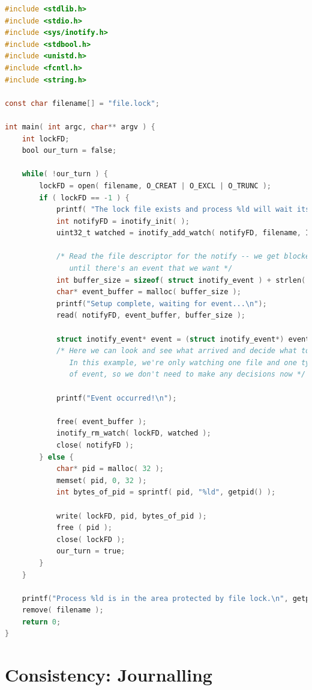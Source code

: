 \begin{lstlisting}[language=C]
#include <stdlib.h>
#include <stdio.h>
#include <sys/inotify.h>
#include <stdbool.h>
#include <unistd.h>
#include <fcntl.h>
#include <string.h>

const char filename[] = "file.lock";

int main( int argc, char** argv ) {
    int lockFD;
    bool our_turn = false;
    
    while( !our_turn ) {
        lockFD = open( filename, O_CREAT | O_EXCL | O_TRUNC );
        if ( lockFD == -1 ) {
            printf( "The lock file exists and process %ld will wait its turn...\n", getpid() ); 
            int notifyFD = inotify_init( );
            uint32_t watched = inotify_add_watch( notifyFD, filename, IN_DELETE_SELF );
            
            /* Read the file descriptor for the notify -- we get blocked here
               until there's an event that we want */
            int buffer_size = sizeof( struct inotify_event ) + strlen( filename ) + 1;
            char* event_buffer = malloc( buffer_size );
            printf("Setup complete, waiting for event...\n");
            read( notifyFD, event_buffer, buffer_size );

            struct inotify_event* event = (struct inotify_event*) event_buffer;
            /* Here we can look and see what arrived and decide what to do.
               In this example, we're only watching one file and one type
               of event, so we don't need to make any decisions now */

            printf("Event occurred!\n");

            free( event_buffer );
            inotify_rm_watch( lockFD, watched );
            close( notifyFD );
        } else {
            char* pid = malloc( 32 );
            memset( pid, 0, 32 );
            int bytes_of_pid = sprintf( pid, "%ld", getpid() );

            write( lockFD, pid, bytes_of_pid ); 
            free ( pid );
            close( lockFD );
            our_turn = true; 
        }
    } 

    printf("Process %ld is in the area protected by file lock.\n", getpid());
    remove( filename );
    return 0;
}
\end{lstlisting}

\section*{Consistency: Journalling}

